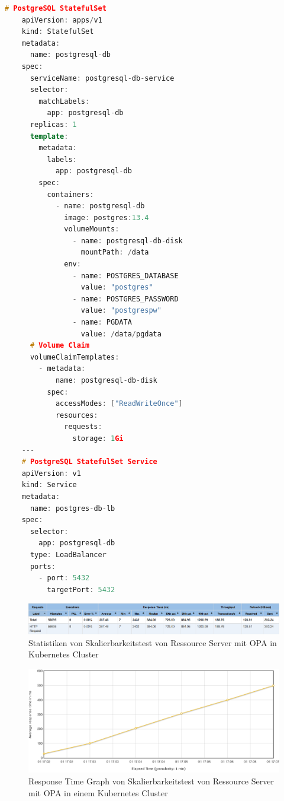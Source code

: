   \begin{lstlisting}[language=C++,frame=tb,caption={Deployment und Service von PostgreSQL als Datenbank für Keycloak},label=lst:DeploymentundServicevonPostgres]
    # PostgreSQL StatefulSet
    apiVersion: apps/v1
    kind: StatefulSet
    metadata:
      name: postgresql-db
    spec:
      serviceName: postgresql-db-service
      selector:
        matchLabels:
          app: postgresql-db
      replicas: 1
      template:
        metadata:
          labels:
            app: postgresql-db
        spec:
          containers:
            - name: postgresql-db
              image: postgres:13.4
              volumeMounts:
                - name: postgresql-db-disk
                  mountPath: /data
              env:
                - name: POSTGRES_DATABASE
                  value: "postgres"
                - name: POSTGRES_PASSWORD
                  value: "postgrespw"
                - name: PGDATA
                  value: /data/pgdata
      # Volume Claim
      volumeClaimTemplates:
        - metadata:
            name: postgresql-db-disk
          spec:
            accessModes: ["ReadWriteOnce"]
            resources:
              requests:
                storage: 1Gi
    ---
    # PostgreSQL StatefulSet Service
    apiVersion: v1
    kind: Service
    metadata:
      name: postgres-db-lb
    spec:
      selector:
        app: postgresql-db
      type: LoadBalancer
      ports:
        - port: 5432
          targetPort: 5432            
  \end{lstlisting}
  \bigskip

  \begin{figure}[H]
    \centering
    \includegraphics[width=1.0\textwidth]{gfx/statistik-skalierung-opa-k8s.png}
    \caption{Statistiken von Skalierbarkeitstest von Ressource Server mit OPA in Kubernetes Cluster}
    \label{fig:chapter04:statistik-skalierung-opa-k8s}
  \end{figure}

  \begin{figure}[H]
    \centering
    \includegraphics[width=1.0\textwidth]{gfx/flotResponseTimesOverTime-skalierung-opa-k8s.png}
    \caption{Response Time Graph von Skalierbarkeitstest von Ressource Server mit OPA in einem Kubernetes Cluster}
    \label{fig:chapter04:flotResponseTimesOverTime-skalierung-opa-k8s}
  \end{figure}

